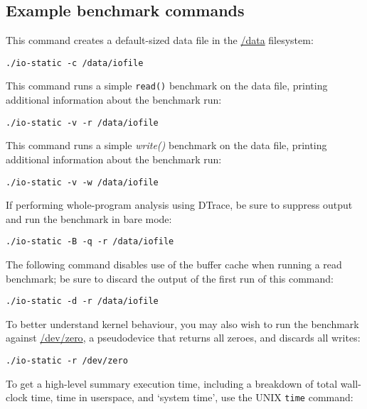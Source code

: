 \documentclass[a4paper,10pt]{article}
\begin{document}
\subsection*{Example benchmark commands}

This command creates a default-sized data file in the \url{/data} filesystem:

\begin{verbatim}
./io-static -c /data/iofile
\end{verbatim}

\noindent
This command runs a simple \texttt{read()} benchmark on the data file,
printing additional information about the benchmark run:

\begin{verbatim}
./io-static -v -r /data/iofile
\end{verbatim}

\noindent
This command runs a simple \textit{write()} benchmark on the data file,
printing additional information about the benchmark run:

\begin{verbatim}
./io-static -v -w /data/iofile
\end{verbatim}

\noindent
If performing whole-program analysis using DTrace, be sure to suppress output
and run the benchmark in bare mode:

\begin{verbatim}
./io-static -B -q -r /data/iofile
\end{verbatim}

\noindent
The following command disables use of the buffer cache when running a read
benchmark; be sure to discard the output of the first run of this command:

\begin{verbatim}
./io-static -d -r /data/iofile
\end{verbatim}

\noindent
To better understand kernel behaviour, you may also wish to run the benchmark
against \url{/dev/zero}, a pseudodevice that returns all zeroes, and discards
all writes:

\begin{verbatim}
./io-static -r /dev/zero
\end{verbatim}

\noindent
To get a high-level summary execution time, including a breakdown of total
wall-clock time, time in userspace, and `system time', use the UNIX
\texttt{time} command:
\end{document}
